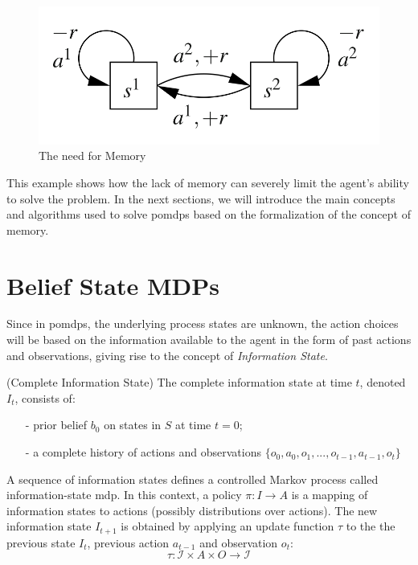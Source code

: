 \begin{figure}[H]
    \centering
    \includegraphics[scale=.2]{images/memorypomdp.png}
    \caption{The need for Memory}
    \label{fig:memory}
\end{figure}

This example shows how the lack of memory can severely limit the agent's ability to solve the problem.
In the next sections, we will introduce the main concepts and algorithms used to solve \gls{pomdp}s based on 
the formalization of the concept of memory.

\section{Belief State MDPs}
Since in \glspl{pomdp}, the underlying process states are unknown, the action choices will be based on the information available 
to the agent in the form of past actions and observations, giving rise to the concept of \textit{Information State}.

\begin{definition}
    (Complete Information State) The complete information state at time $t$, denoted
    $I_t$, consists of:
    \begin{itemize}
        \item[-] prior belief $b_0$ on states in $S$ at time $t=0$;
        \item[-] a complete history of actions and observations $\{o_0,a_0,o_1, ..., o_{t-1},a_{t-1},o_t\}$
    \end{itemize}
\end{definition}

A sequence of information states defines a controlled Markov process called 
information-state \gls{mdp}. In this context, a policy $\pi: I \rightarrow A$ is a mapping of 
information states to actions (possibly distributions over actions).
The new information state $I_{t+1}$ is obtained by applying an update function $\tau$ to the
the previous state $I_t$, previous action $a_{t-1}$ and observation $o_t$:
$$\tau: \mathcal{I} \times A \times O \rightarrow \mathcal{I}$$

